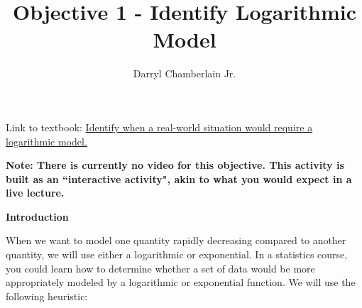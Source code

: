 \documentclass{ximera}
\author{Darryl Chamberlain Jr.}
\title{Objective 1 - Identify Logarithmic Model}
\begin{document}
\begin{abstract}

\end{abstract}

\maketitle
 
Link to textbook: 
\href{https://cnx.org/contents/mwjClAV_@8.21:_tqWoaDz@17/Exponential-and-Logarithmic-Models}{Identify when a real-world situation would require a logarithmic model.}

\textbf{Note: There is currently no video for this objective. This activity is built as an ``interactive activity", akin to what you would expect in a live lecture.}
 

\begin{center} \textbf{\Large Introduction} \end{center}

When we want to model one quantity rapidly decreasing compared to another quantity, we will use either a logarithmic or exponential. In a statistics course, you could learn how to determine whether a set of data would be more appropriately modeled by a logarithmic or exponential function. We will use the following heuristic:
\end{document}
